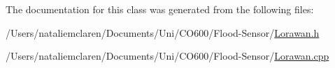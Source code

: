 The documentation for this class was generated from the following files\+:\begin{DoxyCompactItemize}
\item 
/\+Users/nataliemclaren/\+Documents/\+Uni/\+C\+O600/\+Flood-\/\+Sensor/\mbox{\hyperlink{_lorawan_8h}{Lorawan.\+h}}\item 
/\+Users/nataliemclaren/\+Documents/\+Uni/\+C\+O600/\+Flood-\/\+Sensor/\mbox{\hyperlink{_lorawan_8cpp}{Lorawan.\+cpp}}\end{DoxyCompactItemize}
